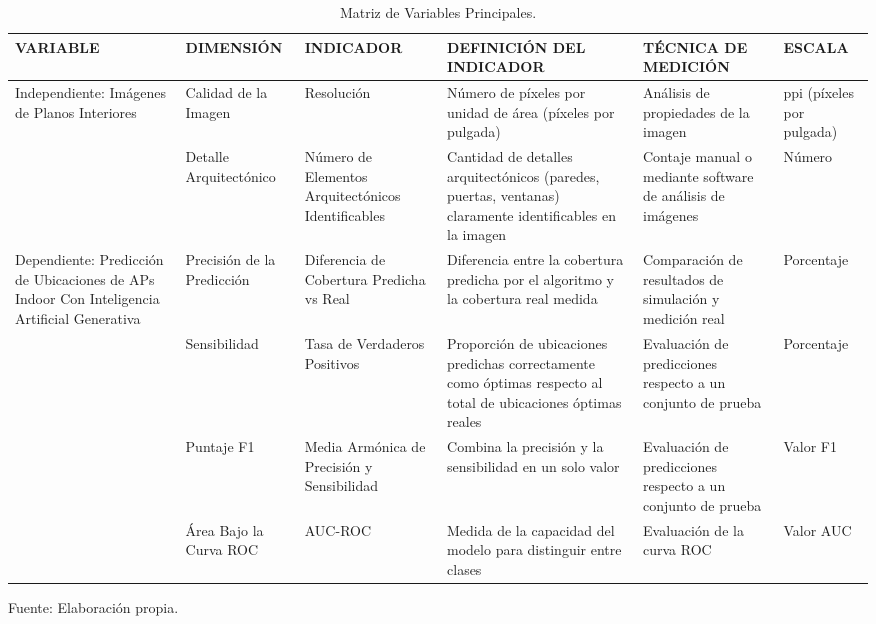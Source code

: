 \begin{longtable}{>{\raggedright\arraybackslash}m{3cm} >{\raggedright\arraybackslash}m{2cm} >{\raggedright\arraybackslash}m{2cm} >{\raggedright\arraybackslash}m{3cm} >{\raggedright\arraybackslash}m{2cm} >{\raggedright\arraybackslash}m{2.5cm}}
    \caption{Matriz de Variables Principales.}
    \label{tabla:variables}\\
    \hline
    VARIABLE & DIMENSIÓN & INDICADOR & DEFINICIÓN DEL INDICADOR & TÉCNICA DE MEDICIÓN & ESCALA \\
    \hline
    Independiente: Imágenes de Planos Interiores & Calidad de la Imagen & Resolución & Número de píxeles por unidad de área (píxeles por pulgada) & Análisis de propiedades de la imagen & ppi (píxeles por pulgada) \\
    \cline{2-6}
     & Detalle Arquitectónico & Número de Elementos Arquitectónicos Identificables & Cantidad de detalles arquitectónicos (paredes, puertas, ventanas) claramente identificables en la imagen & Contaje manual o mediante software de análisis de imágenes & Número \\
    \hline
    Dependiente: Predicción de Ubicaciones de APs Indoor Con Inteligencia Artificial Generativa & Precisión de la Predicción & Diferencia de Cobertura Predicha vs Real & Diferencia entre la cobertura predicha por el algoritmo y la cobertura real medida & Comparación de resultados de simulación y medición real & Porcentaje \\
    \cline{2-6}
     & Sensibilidad & Tasa de Verdaderos Positivos & Proporción de ubicaciones predichas correctamente como óptimas respecto al total de ubicaciones óptimas reales & Evaluación de predicciones respecto a un conjunto de prueba & Porcentaje \\
    \cline{2-6}
     & Puntaje F1 & Media Armónica de Precisión y Sensibilidad & Combina la precisión y la sensibilidad en un solo valor & Evaluación de predicciones respecto a un conjunto de prueba & Valor F1 \\
    \cline{2-6}
     & Área Bajo la Curva ROC & AUC-ROC & Medida de la capacidad del modelo para distinguir entre clases & Evaluación de la curva ROC & Valor AUC \\
    \hline
\end{longtable}
\begin{flushleft}	%
	\small Fuente: Elaboración propia.
\end{flushleft}

